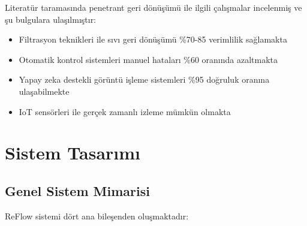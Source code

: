 \documentclass[12pt,a4paper]{article}
\begin{document}
Literatür taramasında penetrant geri dönüşümü ile ilgili çalışmalar incelenmiş ve şu bulgulara ulaşılmıştır:

\begin{itemize}
    \item Filtrasyon teknikleri ile sıvı geri dönüşümü \%70-85 verimlilik sağlamakta
    \item Otomatik kontrol sistemleri manuel hataları \%60 oranında azaltmakta
    \item Yapay zeka destekli görüntü işleme sistemleri \%95 doğruluk oranına ulaşabilmekte
    \item IoT sensörleri ile gerçek zamanlı izleme mümkün olmakta
\end{itemize}

\section{Sistem Tasarımı}

\subsection{Genel Sistem Mimarisi}

ReFlow sistemi dört ana bileşenden oluşmaktadır:
\end{document}
